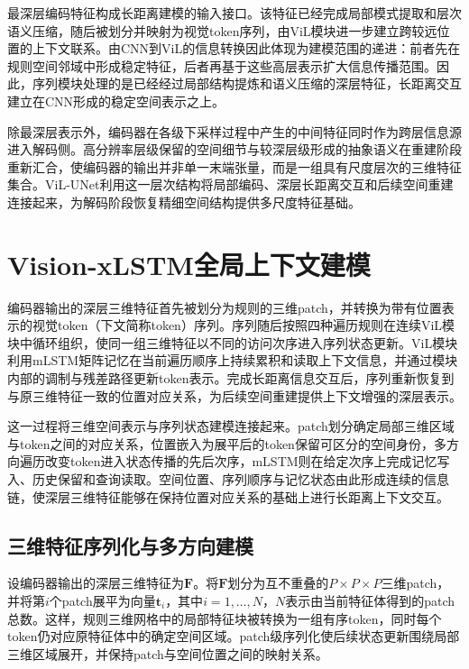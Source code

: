 最深层编码特征构成长距离建模的输入接口。该特征已经完成局部模式提取和层次语义压缩，随后被划分并映射为视觉token序列，由ViL模块进一步建立跨较远位置的上下文联系。由CNN到ViL的信息转换因此体现为建模范围的递进：前者先在规则空间邻域中形成稳定特征，后者再基于这些高层表示扩大信息传播范围。因此，序列模块处理的是已经经过局部结构提炼和语义压缩的深层特征，长距离交互建立在CNN形成的稳定空间表示之上。

除最深层表示外，编码器在各级下采样过程中产生的中间特征同时作为跨层信息源进入解码侧。高分辨率层级保留的空间细节与较深层级形成的抽象语义在重建阶段重新汇合，使编码器的输出并非单一末端张量，而是一组具有尺度层次的三维特征集合。ViL-UNet利用这一层次结构将局部编码、深层长距离交互和后续空间重建连接起来，为解码阶段恢复精细空间结构提供多尺度特征基础。

\section{Vision-xLSTM全局上下文建模}

编码器输出的深层三维特征首先被划分为规则的三维patch，并转换为带有位置表示的视觉token（下文简称token）序列。序列随后按照四种遍历规则在连续ViL模块中循环组织，使同一组三维特征以不同的访问次序进入序列状态更新。ViL模块利用mLSTM矩阵记忆在当前遍历顺序上持续累积和读取上下文信息，并通过模块内部的调制与残差路径更新token表示。完成长距离信息交互后，序列重新恢复到与原三维特征一致的位置对应关系，为后续空间重建提供上下文增强的深层表示。

这一过程将三维空间表示与序列状态建模连接起来。patch划分确定局部三维区域与token之间的对应关系，位置嵌入为展平后的token保留可区分的空间身份，多方向遍历改变token进入状态传播的先后次序，mLSTM则在给定次序上完成记忆写入、历史保留和查询读取。空间位置、序列顺序与记忆状态由此形成连续的信息链，使深层三维特征能够在保持位置对应关系的基础上进行长距离上下文交互。

\subsection{三维特征序列化与多方向建模}

设编码器输出的深层三维特征为\(\mathbf F\)。将\(\mathbf F\)划分为互不重叠的\(P\times P\times P\)三维patch，并将第\(i\)个patch展平为向量\(\mathbf t_i\)，其中\(i=1,\ldots,N\)，\(N\)表示由当前特征体得到的patch总数。这样，规则三维网格中的局部特征块被转换为一组有序token，同时每个token仍对应原特征体中的确定空间区域。patch级序列化使后续状态更新围绕局部三维区域展开，并保持patch与空间位置之间的映射关系。


